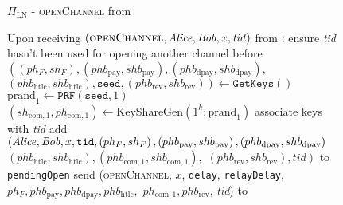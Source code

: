   \begin{figure}[H]
    \begin{protocolbox}{$\Pi_{\mathrm{LN}}$ - \textsc{openChannel} from
    \environment}
      \begin{algorithmic}[1]
        \State Upon receiving $\left(\textsc{openChannel}, \mathit{Alice}, \mathit{Bob}, x,
        \mathit{tid}\right)$ from \environment:
        \Indent
          \State ensure \textit{tid} hasn't been used for opening another
          channel before
          \label{alg:protocol:open:env:valid}
          \State $\left(\left(ph_F, sh_F\right), \left(phb_{\mathrm{pay}},
          shb_{\mathrm{pay}}\right), \left(phb_{\mathrm{dpay}},
          shb_{\mathrm{dpay}}\right),\right.$ $\left.\left(phb_{\mathrm{htlc}},
          shb_{\mathrm{htlc}}\right), \mathtt{seed}, \left(phb_{\mathrm{rev}},
          shb_{\mathrm{rev}}\right)\right) \gets \texttt{GetKeys}\left(\right)$
          \State $\mathrm{prand}_1 \gets \texttt{PRF}\left(\mathtt{seed},
          1\right)$
          \State $\left(sh_{\mathrm{com}, 1}, ph_{\mathrm{com}, 1}\right) \gets
          \mathrm{KeyShareGen}\left(1^k; \mathrm{prand}_1\right)$
          \State associate keys with \textit{tid}
          \State add $\left(\mathit{Alice}, \mathit{Bob}, x, \mathtt{tid}, \left(ph_F,
          sh_F\right), \left(phb_{\mathrm{pay}}, shb_{\mathrm{pay}}\right),
          \left(phb_{\mathrm{dpay}}, shb_{\mathrm{dpay}}\right)\right.$
          $\left.\left(phb_{\mathrm{htlc}}, shb_{\mathrm{htlc}}\right),
          \left(phb_{\mathrm{com}, 1}, shb_{\mathrm{com}, 1}\right),\right.$
          $\left.\left(phb_{\mathrm{rev}}, shb_{\mathrm{rev}}\right),
          \mathit{tid}\right)$ to \texttt{pendingOpen}
          \label{alg:protocol:open:env:pendingOpen}
          \State send (\textsc{openChannel}, $x$, \texttt{delay},
          \texttt{relayDelay}, $ph_F, phb_{\mathrm{pay}}, phb_{\mathrm{dpay}},
          phb_{\mathrm{htlc}},$ $ph_{\mathrm{com}, 1}, phb_{\mathrm{rev}}$,
          \textit{tid}) to \bob{}
        \EndIndent
      \end{algorithmic}
    \end{protocolbox}
    \caption{}
    \label{alg:protocol:open:env}
  \end{figure}

